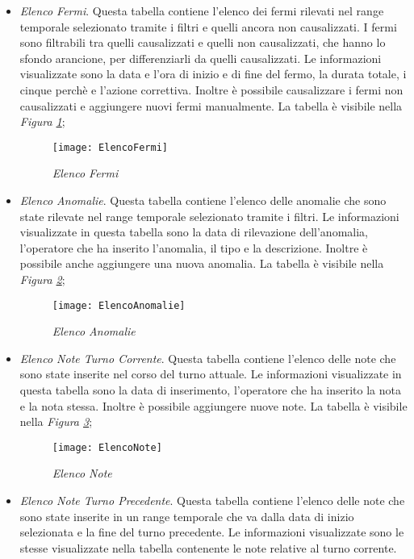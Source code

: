 \begin{itemize}
    \item \textit{Elenco Fermi}. Questa tabella contiene l'elenco dei fermi rilevati nel range temporale selezionato tramite i
    filtri e quelli ancora non causalizzati. I fermi sono filtrabili tra quelli causalizzati e quelli non causalizzati,
    che hanno lo sfondo arancione, per differenziarli da quelli causalizzati. Le informazioni visualizzate sono la data
    e l'ora di inizio e di fine del fermo, la durata totale, i cinque perchè e l'azione correttiva. Inoltre è possibile
    causalizzare i fermi non causalizzati e aggiungere nuovi fermi manualmente. La tabella è visibile nella 
    \textit{Figura \ref{fig:ElencoFermi}};
    
    \begin{figure}[H]
      \texttt{[image: ElencoFermi]}
      \centering
      \caption{\textit{Elenco Fermi}}
      \label{fig:ElencoFermi}
    \end{figure}
    
    
    \item \textit{Elenco Anomalie}. Questa tabella contiene l'elenco delle anomalie che sono state rilevate  nel range
    temporale selezionato tramite i filtri. Le informazioni visualizzate in questa tabella sono la data di rilevazione
    dell'anomalia, l'operatore che ha inserito l'anomalia, il tipo e la descrizione. Inoltre è possibile anche aggiungere
    una nuova anomalia. La tabella è visibile nella \textit{Figura \ref{fig:ElencoAnomalie}};

    \begin{figure}[H]
      \texttt{[image: ElencoAnomalie]}
      \centering
      \caption{\textit{Elenco Anomalie}}
      \label{fig:ElencoAnomalie}
    \end{figure}

    \item \textit{Elenco Note Turno Corrente}. Questa tabella contiene l'elenco delle note che sono state inserite nel corso
    del turno attuale. Le informazioni visualizzate in questa tabella sono la data di inserimento, l'operatore che ha inserito
    la nota e la nota stessa. Inoltre è possibile aggiungere nuove note. La tabella è visibile nella 
    \textit{Figura \ref{fig:ElencoNote}};

    \begin{figure}[H]
      \texttt{[image: ElencoNote]}
      \centering
      \caption{\textit{Elenco Note}}
      \label{fig:ElencoNote}
    \end{figure}

    \item \textit{Elenco Note Turno Precedente}. Questa tabella contiene l'elenco delle note che sono state inserite in
    un range temporale che va dalla data di inizio selezionata e la fine del turno precedente. Le informazioni visualizzate sono
    le stesse visualizzate nella tabella contenente le note relative al turno corrente.
  \end{itemize}

